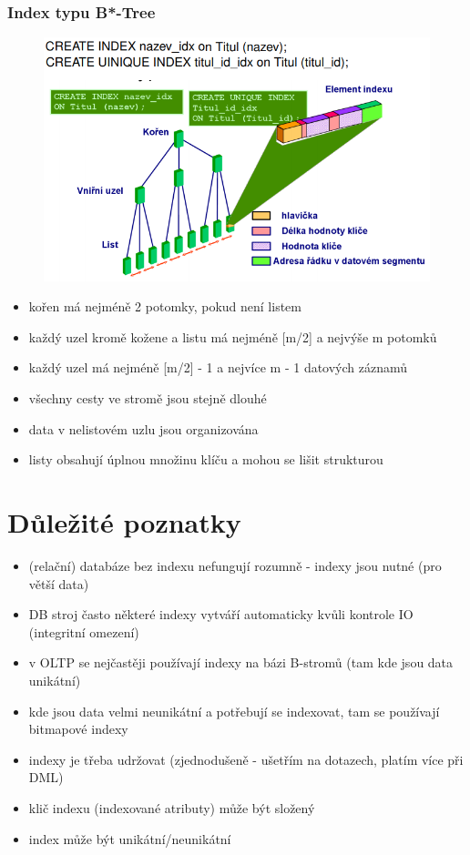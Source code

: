 \documentclass{szzclass}
\begin{document}
\subsubsection{Index typu B*-Tree}
\begin{figure}[h!]
  \centering
  \includegraphics[width = \textwidth]{topics/bi-spol-11/images/bTree.png}
\end{figure}
\begin{itemize}
  \item kořen má nejméně 2 potomky, pokud není listem
  \item každý uzel kromě kožene a listu má nejméně [m/2] a nejvýše m potomků
  \item každý uzel má nejméně [m/2] - 1 a nejvíce m - 1 datových záznamů
  \item všechny cesty ve stromě jsou stejně dlouhé
  \item data v nelistovém uzlu jsou organizována
  \item listy obsahují úplnou množinu klíču a mohou se lišit strukturou
\end{itemize}
\section{Důležité poznatky}
\begin{itemize}
  \item (relační) databáze bez indexu nefungují rozumně - indexy jsou nutné (pro větší data)
  \item DB stroj často některé indexy vytváří automaticky kvůli kontrole IO (integritní omezení)
  \item v OLTP se nejčastěji používají indexy na bázi B-stromů (tam kde jsou data unikátní)
  \item kde jsou data velmi neunikátní a potřebují se indexovat, tam se používají bitmapové indexy
  \item indexy je třeba udržovat (zjednodušeně - ušetřím na dotazech, platím více při DML)
  \item klič indexu (indexované atributy) může být složený
  \item index může být unikátní/neunikátní
\end{itemize}
\end{document}
